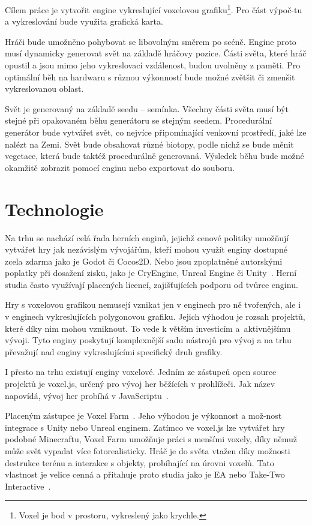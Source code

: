 \documentclass[thesis=M,czech]{FITthesis}[2019/12/23]
\begin{document}
Cílem práce je vytvořit engine vykreslující voxelovou grafiku\footnote{Voxel je bod v prostoru, vykreslený jako krychle.}. Pro část výpoč-tu a vykreslování bude využita grafická karta.

Hráči bude umožněno pohybovat se libovolným směrem po scéně. Engine proto musí dynamicky generovat svět na základě hráčovy pozice. Části světa, které hráč opustil a jsou mimo jeho vykreslovací vzdálenost, budou uvolněny z paměti. Pro optimální běh na hardwaru s různou výkonností bude možné zvětšit či zmenšit vykreslovanou oblast.

Svět je generovaný na základě seedu -- semínka. Všechny části světa musí být stejné při opakovaném běhu generátoru se stejným seedem. Procedurální generátor bude vytvářet svět, co nejvíce připomínající venkovní prostředí, jaké lze nalézt na Zemi. Svět bude obsahovat různé biotopy, podle nichž se bude měnit vegetace, která bude taktéž procedurálně generovaná. Výsledek běhu bude možné okamžitě zobrazit pomocí enginu nebo exportovat do souboru.


\chapter{Technologie}

Na trhu se nachází celá řada herních enginů, jejichž cenové politiky umožňují vytvářet hry jak nezávislým vývojářům, kteří mohou využít enginy dostupné zcela zdarma jako je Godot či Cocos2D. Nebo jsou zpoplatněné autorskými poplatky při dosažení zisku, jako je CryEngine, Unreal Engine či Unity~\cite{engines}. Herní studia často využívají placených licencí, zajišťujících podporu od tvůrce enginu.

Hry s voxelovou grafikou nemusejí vznikat jen v enginech pro ně tvořených, ale i v enginech vykreslujících polygonovou grafiku. Jejich výhodou je rozsah projektů, které díky nim mohou vzniknout. To vede k větším investicím a~aktivnějšímu vývoji. Tyto enginy poskytují komplexnější sadu nástrojů pro vývoj a na trhu převažují nad enginy vykreslujícími specifický druh grafiky.

I přesto na trhu existují enginy voxelové. Jedním ze zástupců open source projektů je voxel.js, určený pro vývoj her běžících v prohlížeči. Jak název napovídá, vývoj her probíhá v JavaScriptu~\cite{voxel_js}.

Placeným zástupce je Voxel Farm~\cite{voxel_farm}. Jeho výhodou je výkonnost a mož-nost integrace s Unity nebo Unreal enginem. Zatímco ve voxel.js lze vytvářet hry podobné Minecraftu, Voxel Farm umožňuje práci s menšími voxely, díky němuž může svět vypadat více fotorealisticky. Hráč je do světa vtažen díky možnosti destrukce terénu a interakce s objekty, probíhající na úrovni voxelů. Tato vlastnost je velice cenná a přitahuje proto studia jako je EA nebo Take-Two Interactive~\cite{voxel_engines}.
\end{document}
